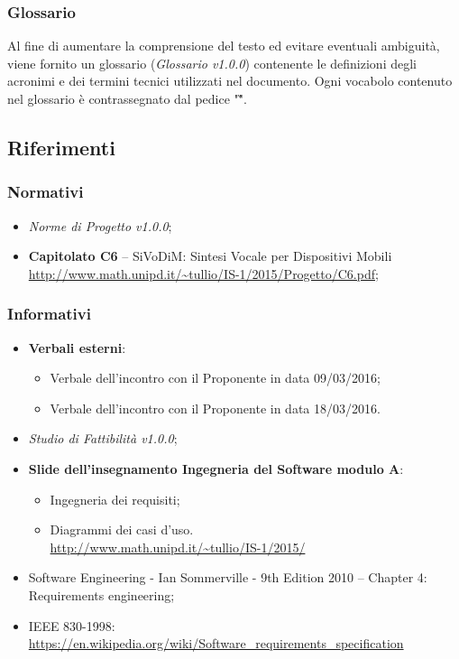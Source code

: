 \subsubsection{Glossario}
Al fine di aumentare la comprensione del testo ed evitare eventuali ambiguità, 
viene fornito un glossario (\textit{Glossario v1.0.0}) contenente le 
definizioni degli acronimi e dei termini tecnici utilizzati nel documento. Ogni 
vocabolo contenuto nel glossario è contrassegnato dal pedice "\G ".

\subsection{Riferimenti}

\subsubsection{Normativi}
\begin{itemize}
\item \textit{Norme di Progetto v1.0.0};
\item \textbf{Capitolato C6} – SiVoDiM: Sintesi Vocale per Dispositivi Mobili\\ 
\url{http://www.math.unipd.it/~tullio/IS-1/2015/Progetto/C6.pdf};
\end{itemize}

\subsubsection{Informativi}
\begin{itemize}
\item \textbf{Verbali esterni}:
\begin{itemize}
\item Verbale dell'incontro con il Proponente in data 09/03/2016;
\item Verbale dell'incontro con il Proponente in data 18/03/2016.
\end{itemize}
\item \textit{Studio di Fattibilità v1.0.0};
\item \textbf{Slide dell’insegnamento Ingegneria del Software modulo A}:
\begin{itemize}
\item Ingegneria dei requisiti;
\item Diagrammi dei casi d'uso.\\
\url{http://www.math.unipd.it/~tullio/IS-1/2015/}
\end{itemize}
\item Software Engineering - Ian Sommerville - 9th Edition 2010 – Chapter 4: Requirements engineering;
\item IEEE 830-1998: \url{ https://en.wikipedia.org/wiki/Software_requirements_specification}
\end{itemize}

\newpage